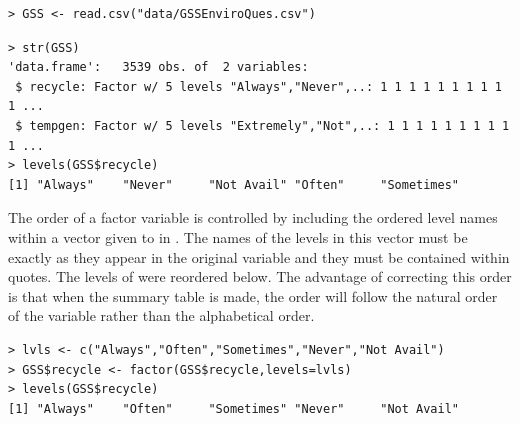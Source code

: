 \documentclass[10pt,openany]{book}\usepackage[]{graphicx}\usepackage[]{color}
\makeatletter
\newenvironment{kframe}{%
 \def\at@end@of@kframe{}%
 \ifinner\ifhmode%
  \def\at@end@of@kframe{\end{minipage}}%
  \begin{minipage}{\columnwidth}%
 \fi\fi%
 \def\FrameCommand##1{\hskip\@totalleftmargin \hskip-\fboxsep
 \colorbox{shadecolor}{##1}\hskip-\fboxsep
     \hskip-\linewidth \hskip-\@totalleftmargin \hskip\columnwidth}%
 \MakeFramed {\advance\hsize-\width
   \@totalleftmargin\z@ \linewidth\hsize
   \@setminipage}}%
 {\par\unskip\endMakeFramed%
 \at@end@of@kframe}
\newenvironment{knitrout}{}{} %
\makeatother
\begin{document}
\begin{knitrout}
\color{fgcolor}\begin{kframe}
\begin{verbatim}
> GSS <- read.csv("data/GSSEnviroQues.csv")
\end{verbatim}
\end{kframe}
\end{knitrout}
\begin{knitrout}
\color{fgcolor}\begin{kframe}
\begin{verbatim}
> str(GSS)
'data.frame':	3539 obs. of  2 variables:
 $ recycle: Factor w/ 5 levels "Always","Never",..: 1 1 1 1 1 1 1 1 1 1 ...
 $ tempgen: Factor w/ 5 levels "Extremely","Not",..: 1 1 1 1 1 1 1 1 1 1 ...
> levels(GSS$recycle)
[1] "Always"    "Never"     "Not Avail" "Often"     "Sometimes"
\end{verbatim}
\end{kframe}
\end{knitrout}

The order of a factor variable is controlled by including the ordered level names within a vector given to  in . The names of the levels in this vector must be exactly as they appear in the original variable and they must be contained within quotes. The levels of  were reordered below. The advantage of correcting this order is that when the summary table is made, the order will follow the natural order of the variable rather than the alphabetical order.
\begin{knitrout}
\color{fgcolor}\begin{kframe}
\begin{verbatim}
> lvls <- c("Always","Often","Sometimes","Never","Not Avail")
> GSS$recycle <- factor(GSS$recycle,levels=lvls)
> levels(GSS$recycle)
[1] "Always"    "Often"     "Sometimes" "Never"     "Not Avail"
\end{verbatim}
\end{kframe}
\end{knitrout}

\end{document}
